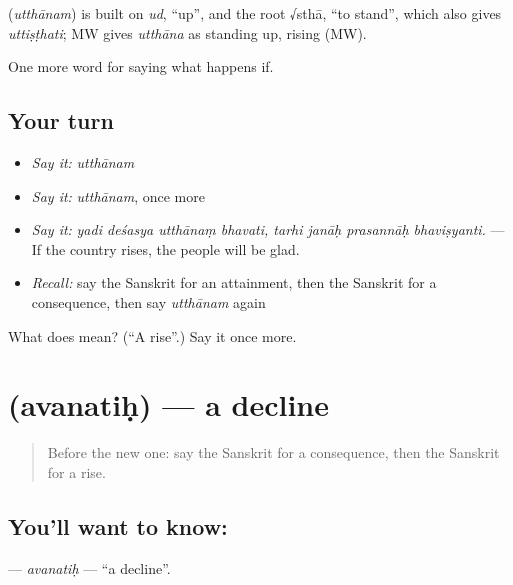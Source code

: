 \begin{cousinweb}
\textbf{} (\emph{utthānam}) is built on \emph{ud}, \textquotedblleft{}up\textquotedblright{}, and the root √sthā, \textquotedblleft{}to stand\textquotedblright{}, which also gives \emph{uttiṣṭhati}; MW gives \emph{utthāna} as standing up, rising (MW).
\end{cousinweb}

\begin{grammarlens}[title={What you've built}]
One more word for saying what happens if.
\end{grammarlens}

\subsection*{Your turn}
\begin{itemize}
\raggedright
  \item \emph{Say it:} \emph{utthānam}
  \item \emph{Say it:} \emph{utthānam}, once more
  \item \emph{Say it:} \emph{yadi deśasya utthānaṃ bhavati, tarhi janāḥ prasannāḥ bhaviṣyanti.} — If the country rises, the people will be glad.
  \item \emph{Recall:} say the Sanskrit for an attainment, then the Sanskrit for a consequence, then say \emph{utthānam} again
\end{itemize}

\begin{tcolorbox}[breakable,colback=teal!4,colframe=teal!35!black,title={Before you move on}]
What does  mean? (\textquotedblleft{}A rise\textquotedblright{}.) Say it once more.
\end{tcolorbox}
\section[\texorpdfstring{\sk{अवनतिः} (avanatiḥ)}{अवनतिः (avanatiḥ)}]{ (avanatiḥ) — a decline}

\label{lesson:SA-C547-avanatih}



\begin{quote}
Before the new one: say the Sanskrit for a consequence, then the Sanskrit for a rise.
\end{quote}

\subsection*{You'll want to know: }
\textbf{} — \emph{avanatiḥ} — \textquotedblleft{}a decline\textquotedblright{}.


